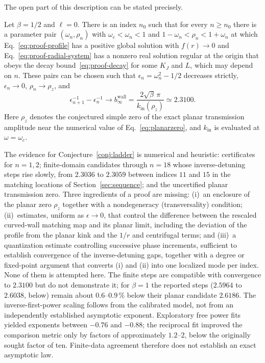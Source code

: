 The open part of this description can be stated precisely.
\begin{conjecture}\label{conj:ladder}
Let $\beta=1/2$ and $\ell=0$. There is an index $n_0$ such that for
every $n\ge n_0$ there is a parameter pair $(\omega_n,\rho_n)$ with
$\omega_c<\omega_n<1$ and $1-\omega_n<\rho_n<1+\omega_n$ at which
Eq.~\eqref{eq:proof-profile} has a positive global solution with
$f(r)\to0$ and Eq.~\eqref{eq:proof-radial-system} has a nonzero real
solution regular at the origin that obeys the decay
bound~\eqref{eq:proof-decay} for some $K_J$ and $L$, which may depend
on $n$. These pairs can be chosen such that $\epsilon_n=\omega_n^2-1/2$
decreases strictly, $\epsilon_n\to0$, $\rho_n\to\rho_z$, and
\begin{equation*}
\epsilon_{n+1}^{-1}-\epsilon_n^{-1}\longrightarrow
b_\infty^{\mathrm{wall}}=\frac{2\sqrt\beta\,\pi}{k_{\mathrm{in}}(\rho_z)}
\simeq2.3100 .
\end{equation*}
Here $\rho_z$ denotes the conjectured simple zero of the exact planar
transmission amplitude near the numerical value of
Eq.~\eqref{eq:planarzero}, and $k_{\mathrm{in}}$ is evaluated at
$\omega=\omega_c$.
\end{conjecture}
The evidence for Conjecture~\ref{conj:ladder} is numerical and
heuristic: certificates for $n=1,2$; finite-domain candidates through
$n=18$ whose inverse-detuning steps rise slowly, from $2.3036$ to
$2.3059$ between indices $11$ and $15$ in the matching locations of
Section~\ref{sec:sequence}; and the uncertified planar transmission
zero. Three ingredients of a proof are missing: (i)~an enclosure of the
planar zero $\rho_z$ together with a nondegeneracy (transversality)
condition; (ii)~estimates, uniform as $\epsilon\to0$, that control the
difference between the rescaled curved-wall matching map and its planar
limit, including the deviation of the profile from the planar kink and
the $1/r$ and centrifugal terms; and (iii)~a quantization estimate
controlling successive phase increments, sufficient to establish
convergence of the inverse-detuning gaps, together with a degree or
fixed-point argument that converts (i) and (ii) into one localized mode
per index.
None of them is attempted here. The finite steps are compatible with
convergence to $2.3100$ but do not demonstrate it; for $\beta=1$ the
reported steps ($2.5964$ to $2.6038$, below) remain about $0.6$--$0.9\,\%$
below their planar candidate $2.6186$.
The inverse-first-power scaling follows from the calibrated model, not
from an independently established asymptotic exponent. Exploratory free
power fits yielded exponents between $-0.76$ and $-0.88$; the reciprocal
fit improved the comparison metric only by factors of approximately
$1.2$--$2$, below the originally sought factor of ten. Finite-data agreement
therefore does not establish an exact asymptotic law.

